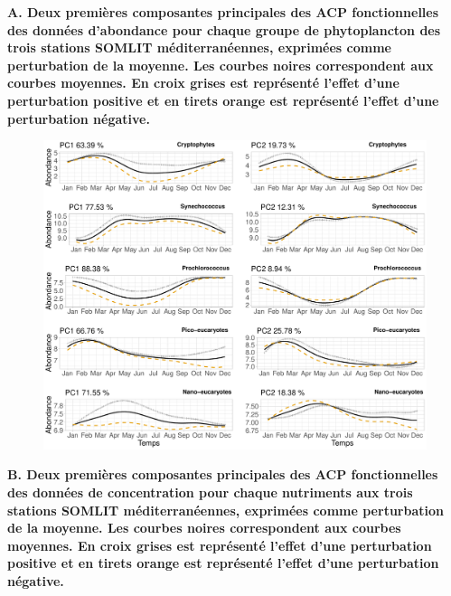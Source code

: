 \documentclass[12pt]{article}
\begin{document}
\newpage
\begin{appendices}

{\bfseries A. Deux premières composantes principales des ACP fonctionnelles des données d'abondance pour chaque groupe de phytoplancton des trois stations SOMLIT méditerranéennes, exprimées comme perturbation de la moyenne. Les courbes noires correspondent aux courbes moyennes. En croix grises est représenté l’effet d’une perturbation positive et en tirets orange est représenté l’effet d’une perturbation négative. }

\begin{figure}
\centering
\includegraphics[width=\textwidth, height=.75\textheight]{fig/ANNEXE_fpca_ab.pdf}
\label{fpca_ab}
\end{figure}

\newpage

{\bfseries B. Deux premières composantes principales des ACP fonctionnelles des données de concentration pour chaque nutriments aux trois stations SOMLIT méditerranéennes, exprimées comme perturbation de la moyenne. Les courbes noires correspondent aux courbes moyennes. En croix grises est représenté l’effet d’une perturbation positive et en tirets orange est représenté l’effet d’une perturbation négative. }


\end{appendices}
\end{document}
